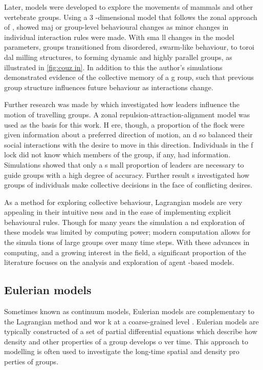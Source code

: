 Later, models were developed to explore the movements of mammals and other vertebrate groups. Using a 3
-dimensional model that follows the zonal approach of \textcite{aoki82}, \textcite{couzin02} showed maj
or group-level behavioural changes as minor changes in individual interaction rules were made. With sma
ll changes in the model parameters, groups transitioned from disordered, swarm-like behaviour, to toroi
dal milling structures, to forming dynamic and highly parallel groups, as illustrated in \cref{fig:couz
in}. In addition to this the author's simulations demonstrated evidence of the collective memory of a g
roup, such that previous group structure influences future behaviour as interactions change.

Further research was made by \textcite{couzin05} which investigated how leaders influence the motion of
 travelling groups. A zonal repulsion-attraction-alignment model was used as the basis for this work. H
ere, though, a proportion of the flock were given information about a preferred direction of motion, an
d so balanced their social interactions with the desire to move in this direction. Individuals in the f
lock did not know which members of the group, if any, had information. Simulations showed that only a s
mall proportion of leaders are necessary to guide groups with a high degree of accuracy. Further result
s investigated how groups of individuals make collective decisions in the face of conflicting desires.

As a method for exploring collective behaviour, Lagrangian models are very appealing in their intuitive
ness and in the ease of implementing explicit behavioural rules. Though for many years the simulation a
nd exploration of these models was limited by computing power; modern computation allows for the simula
tions of large groups over many time steps. With these advances in computing, and a growing interest in
 the field, a significant proportion of the literature focuses on the analysis and exploration of agent
-based models.

\subsection{Eulerian models}
\label{ssec:eulerian_models}

Sometimes known as continuum models, Eulerian models are complementary to the Lagrangian method and wor
k at a coarse-grained level \parencite{giardina08}. Eulerian models are typically constructed of a set 
of partial differential equations which describe how density and other properties of a group develops o
ver time. This approach to modelling is often used to investigate the long-time spatial and density pro
perties of groups.

